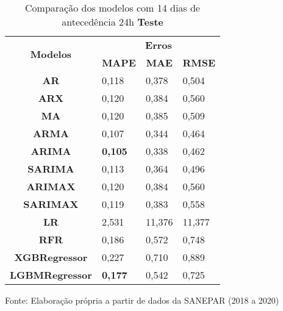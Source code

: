 \begin{table}[H]
	\centering
	\caption{Comparação dos modelos com 14 dias de antecedência 24h \textbf{Teste} }\label{tb:30-24tst}
	\begin{tabular}{@{}clll@{}}
		\toprule
		\multirow{2}{*}{\textbf{Modelos}} & \multicolumn{3}{c}{\textbf{Erros}}                                                                       \\ \cmidrule(l){2-4} 
		& \multicolumn{1}{c}{\textbf{MAPE}} & \multicolumn{1}{c}{\textbf{MAE}} & \multicolumn{1}{c}{\textbf{RMSE}} \\ \hline
\textbf{AR}                       & 0,118                             & 0,378                            & 0,504                             \\
\textbf{ARX}                      & 0,120                             & 0,384                            & 0,560                             \\
\textbf{MA}                       & 0,120                             & 0,385                            & 0,509                             \\
\textbf{ARMA}                     & 0,107                             & 0,344                            & 0,464                             \\
\textbf{ARIMA}                    & \textbf{0,105}                             & 0,338                            & 0,462                             \\
\textbf{SARIMA}                   & 0,113                             & 0,364                            & 0,496                             \\
\textbf{ARIMAX}                   & 0,120                             & 0,384                            & 0,560                             \\
\textbf{SARIMAX}                  & 0,119                             & 0,383                            & 0,558                             \\
\textbf{LR}                       & 2,531                             & 11,376                           & 11,377                            \\
\textbf{RFR}                      & 0,186                             & 0,572                            & 0,748                             \\
\textbf{XGBRegressor}             & 0,227                             & 0,710                            & 0,889                             \\
\textbf{LGBMRegressor}            & \textbf{0,177}                             & 0,542                            & 0,725                             \\ \bottomrule
	\end{tabular}

Fonte: Elaboração própria a partir de dados da SANEPAR (2018 a 2020)
\end{table}

